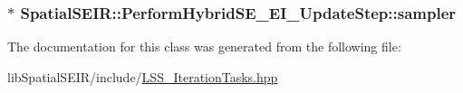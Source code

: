 \hypertarget{classSpatialSEIR_1_1PerformHybridSE__EI__UpdateStep_a9afc7c610b2be704bc1517ce8b566534}{
\subsubsection[{sampler}]{$\ast$ Spatial\-S\-E\-I\-R\-::\-Perform\-Hybrid\-S\-E\-\_\-\-E\-I\-\_\-\-Update\-Step\-::sampler}}\label{classSpatialSEIR_1_1PerformHybridSE__EI__UpdateStep_a9afc7c610b2be704bc1517ce8b566534}


The documentation for this class was generated from the following file\-:\begin{DoxyCompactItemize}
\item 
lib\-Spatial\-S\-E\-I\-R/include/\hyperlink{LSS__IterationTasks_8hpp}{L\-S\-S\-\_\-\-Iteration\-Tasks.\-hpp}\end{DoxyCompactItemize}
